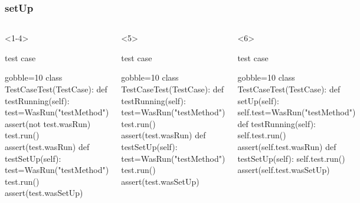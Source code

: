 \documentclass[lualatex]{beamer}
\begin{document}
\begin{frame}[fragile,t]
  \frametitle{setUp}

  \begin{columns}[t]
    \small
    \begin{onlyenv}<1-4>
      \begin{block}{test case}
        \begin{pythoncode*}{gobble=10}
          class TestCaseTest(TestCase):
            def testRunning(self):
              test=WasRun("testMethod")
              assert(not test.wasRun)
              test.run()
              assert(test.wasRun)
            def testSetUp(self):
              test=WasRun("testMethod")
              test.run()
              assert(test.wasSetUp)
        \end{pythoncode*}
      \end{block}
    \end{onlyenv}
    \begin{onlyenv}<5>
      \begin{block}{test case}
        \begin{pythoncode*}{gobble=10}
          class TestCaseTest(TestCase):
            def testRunning(self):
              test=WasRun("testMethod")
              test.run()
              assert(test.wasRun)
            def testSetUp(self):
              test=WasRun("testMethod")
              test.run()
              assert(test.wasSetUp)
        \end{pythoncode*}
      \end{block}
    \end{onlyenv}
    \begin{onlyenv}<6>
      \begin{block}{test case}
        \begin{pythoncode*}{gobble=10}
          class TestCaseTest(TestCase):
            def setUp(self):
              self.test=WasRun("testMethod")
            def testRunning(self):
              self.test.run()
              assert(self.test.wasRun)
            def testSetUp(self):
              self.test.run()
              assert(self.test.wasSetUp)
        \end{pythoncode*}
      \end{block}
    \end{onlyenv}


\end{columns}
\end{frame}
\end{document}
